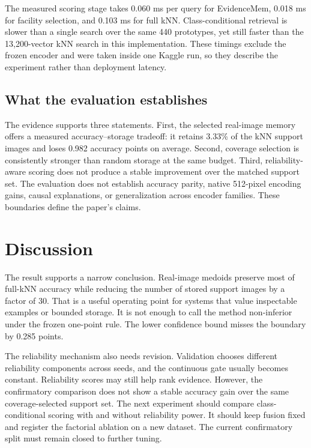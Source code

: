 \documentclass[10pt,twocolumn]{article}
\newcommand{\method}{EvidenceMem}
\begin{document}
The measured scoring stage takes 0.060 ms per query for \method{}, 0.018 ms for facility
selection, and 0.103 ms for full kNN. Class-conditional retrieval is slower than a
single search over the same 440 prototypes, yet still faster than the 13,200-vector kNN
search in this implementation. These timings exclude the frozen encoder and were taken
inside one Kaggle run, so they describe the experiment rather than deployment latency.

\subsection{What the evaluation establishes}

The evidence supports three statements. First, the selected real-image memory offers
a measured accuracy--storage tradeoff: it retains 3.33\% of the kNN support images and
loses 0.982 accuracy points on average. Second, coverage selection is consistently
stronger than random storage at the same budget. Third, reliability-aware scoring does
not produce a stable improvement over the matched support set. The evaluation does not
establish accuracy parity, native 512-pixel encoding gains, causal explanations, or
generalization across encoder families. These boundaries define the paper's claims.

\section{Discussion}

The result supports a narrow conclusion. Real-image medoids preserve most of full-kNN
accuracy while reducing the number of stored support images by a factor of 30. That is
a useful operating point for systems that value inspectable examples or bounded storage.
It is not enough to call the method non-inferior under the frozen one-point rule. The
lower confidence bound misses the boundary by 0.285 points.

The reliability mechanism also needs revision. Validation chooses different reliability
components across seeds, and the continuous gate usually becomes constant. Reliability
scores may still help rank evidence. However, the confirmatory comparison does not show
a stable accuracy gain over the same coverage-selected support set. The next experiment
should compare class-conditional scoring with and without reliability power. It should
keep fusion fixed and register the factorial ablation on a new dataset. The current
confirmatory split must remain closed to further tuning.
\end{document}
